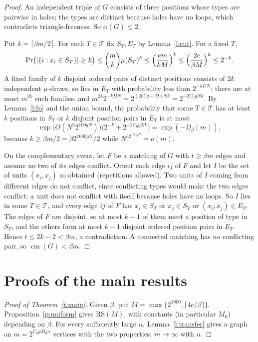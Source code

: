 \documentclass[11pt]{article}
\theoremstyle{definition}\newtheorem{conjecture}[theorem]{Conjecture}
\theoremstyle{remark}\newtheorem{remark}[theorem]{Remark}
\newcommand{\cm}{\operatorname{cm}}
\newcommand{\RS}{\mathrm{RS}}
\begin{document}
\begin{proof}
An independent triple of $G$ consists of three positions whose types are pairwise in holes; the types are distinct because
holes have no loops, which contradicts triangle-freeness. So $\alpha(G)\le2$.

Put $k=\lceil\beta m/2\rceil$. For each $T\in\mathcal T$ fix $S_T,E_T$ by Lemma~\ref{l:cut}. For a fixed $T$,
\[
 \Pr\bigl(|\{i:x_i\in S_T\}|\ge k\bigr)\le\binom mk\mu(S_T)^k\le\Bigl(\frac{em}{kM}\Bigr)^k\le\Bigl(\frac{2e}{\beta M}\Bigr)^k\le2^{-k}.
\]
A fixed family of $k$ disjoint ordered pairs of distinct positions consists of $2k$ independent $\mu$-draws, so lies in
$E_T$ with probability less than $2^{-kDN}$; there are at most $m^{2k}$ such families, and
$m^{2k}2^{-kDN}=2^{(2C_0g-D)Nk}=2^{-2C_0gNk}$. By Lemma~\ref{l:fp} and the union bound, the probability that some
$T\in\mathcal T$ has at least $k$ positions in $S_T$ or $k$ disjoint position pairs in $E_T$ is at most
\[
 \exp\bigl(O(N^3 2^{100gN})\bigr)\bigl(2^{-k}+2^{-2C_0gNk}\bigr)=\exp(-\Omega_\beta(m)),
\]
because $k\ge\beta m/2=\beta2^{1000gN}/2$ while $N^32^{100gN}=o(m)$.

On the complementary event, let $F$ be a matching of $G$ with $t\ge\beta m$ edges and assume no two of its edges conflict.
Orient each edge $ij$ of $F$ and let $I$ be the set of units $(x_i,x_j)$ so obtained (repetitions allowed). Two units of $I$
coming from different edges do not conflict, since conflicting types would make the two edges conflict; a unit does not
conflict with itself because holes have no loops. So $I$ lies in some $T\in\mathcal T$, and every edge $ij$ of $F$ has
$x_i\in S_T$ or $x_j\in S_T$ or $(x_i,x_j)\in E_T$. The edges of $F$ are disjoint, so at most $k-1$ of them meet a position
of type in $S_T$, and the others form at most $k-1$ disjoint ordered position pairs in $E_T$. Hence
$t\le2k-2<\beta m$, a contradiction. A connected matching has no conflicting pair, so $\cm(G)<\beta m$.
\end{proof}

\section{Proofs of the main results}\label{s:proofs}
\begin{proof}[Proof of Theorem~\ref{t:main}]
Given $\beta$, put $M=\max\{2^{1000},\lceil4e/\beta\rceil\}$. Proposition~\ref{p:uniform} gives $\RS(M)$, with constants
(in particular $M_0$) depending on $\beta$. For every sufficiently large $n$, Lemma~\ref{l:transfer} gives a graph on
$m=2^{C_0gM_0n}$ vertices with the two properties; $m\to\infty$ with $n$.
\end{proof}
\end{document}
